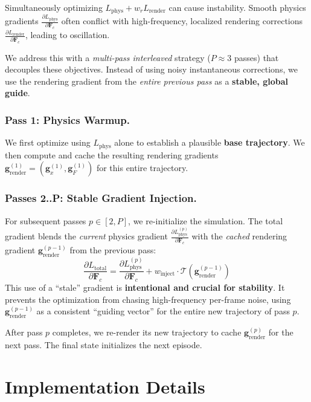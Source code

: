     Simultaneously optimizing $L_{\text{phys}} + w_r L_{\text{render}}$ can cause instability. Smooth physics gradients $\frac{\partial L_{\text{phys}}}{\partial \mathbf{F}_c}$ often conflict with high-frequency, localized rendering corrections $\frac{\partial L_{\text{render}}}{\partial \mathbf{F}_c}$, leading to oscillation.
    
    We address this with a \emph{multi-pass interleaved} strategy ($P{\approx}3$ passes) that decouples these objectives. Instead of using noisy instantaneous corrections, we use the rendering gradient from the \emph{entire previous pass} as a \textbf{stable, global guide}.
    
    \subsubsection{Pass 1: Physics Warmup.}
    We first optimize using $L_{\text{phys}}$ alone to establish a plausible \textbf{base trajectory}. We then compute and cache the resulting rendering gradients $\mathbf{g}_{\text{render}}^{(1)} = (\mathbf{g}_x^{(1)}, \mathbf{g}_F^{(1)})$ for this entire trajectory.
    
    \subsubsection{Passes 2..P: Stable Gradient Injection.}
    For subsequent passes $p \in [2, P]$, we re-initialize the simulation. The total gradient blends the \emph{current} physics gradient $\frac{\partial L_{\text{phys}}^{(p)}}{\partial \mathbf{F}_c}$ with the \emph{cached} rendering gradient $\mathbf{g}_{\text{render}}^{(p-1)}$ from the previous pass:
    $$
    \frac{\partial L_{\text{total}}}{\partial \mathbf{F}_c}
    = \frac{\partial L_{\text{phys}}^{(p)}}{\partial \mathbf{F}_c}
    + w_{\text{inject}} \cdot \mathcal{T}(\mathbf{g}_{\text{render}}^{(p-1)})
    $$
    This use of a \enquote{stale} gradient is \textbf{intentional and crucial for stability}. It prevents the optimization from chasing high-frequency per-frame noise, using $\mathbf{g}_{\text{render}}^{(p-1)}$ as a consistent \enquote{guiding vector} for the entire new trajectory of pass $p$. 
    
    After pass $p$ completes, we re-render its new trajectory to cache $\mathbf{g}_{\text{render}}^{(p)}$ for the next pass. The final state initializes the next episode.

\section{Implementation Details}
\label{sec:implementation}


